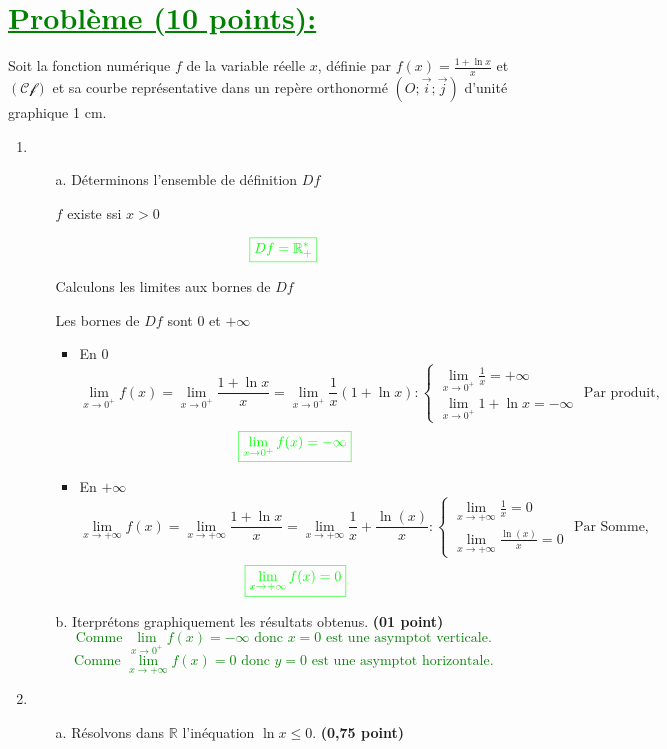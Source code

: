 \documentclass[12pt]{article}
\begin{document}
\section*{\textcolor{green}{\underline{Problème (10 points):}}}
Soit la fonction numérique $f$ de la variable réelle $x$, définie par $f(x)=\frac{1+\ln x}{x}$ et $(\mathscr{Cf})$ et sa courbe représentative dans un repère orthonormé $(O;\vec{i};\vec{j})$ d'unité graphique 1 cm.
\begin{enumerate}
\item 
\begin{itemize}
\item[a.] Déterminons l'ensemble  de définition $Df$

$f$ existe ssi $x>0$

$$\textcolor{green}{\boxed{Df=\mathbb{R}^{*}_{+}}}$$

Calculons les limites aux bornes  de $Df$

Les bornes de $Df$ sont $0$ et $+\infty$
\begin{itemize}
\item En $0$
\[
\lim_{x \to 0^{+}}f(x)=\lim_{x \to 0^{+}}\frac{1+\ln x}{x}=\lim_{x \to 0^{+}}\frac{1}{x}\left( 1+\ln x\right) :\begin{cases}
\lim_{x \to 0^{+}}\frac{1}{x}=+\infty\\
\lim_{x \to 0^{+}}1+\ln x=-\infty
\end{cases} \text{ Par produit,}
\]
$$\textcolor{green}{\boxed{\lim_{x \to 0^{+}}f(x)=-\infty}}$$
\item En $+\infty$
\[
\lim_{x \to +\infty}f(x)=\lim_{x \to +\infty}\frac{1+\ln x}{x}=\lim_{x \to +\infty}\frac{1}{x}+\frac{\ln(x)}{x}:\begin{cases}
\lim_{x \to +\infty}\frac{1}{x}=0\\
\lim_{x \to +\infty}\frac{\ln(x)}{x}=0
\end{cases} \text{ Par Somme,}
\]
$$\textcolor{green}{\boxed{\lim_{x \to +\infty}f(x)=0}}$$
\end{itemize}
\item[b.] Iterprétons graphiquement les résultats obtenus. \textbf{(01 point)}
\textcolor{green}{
$$\text{Comme }\lim_{x \to 0^{+}}f(x)=-\infty \text{ donc } x=0 \text{ est une asymptot verticale.}$$
$$\text{Comme }\lim_{x \to +\infty}f(x)=0 \text{ donc } y=0 \text{ est une asymptot horizontale.}$$
}
\end{itemize}
\item 
\begin{itemize}
\item[a.] Résolvons dans $\mathbb{R}$ l'inéquation $\ln x \leq 0$. \textbf{(0,75 point)}


\end{itemize}
\end{enumerate}
\end{document}
